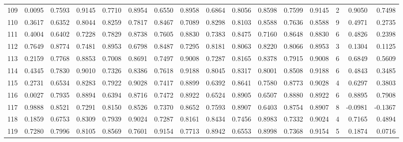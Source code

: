 \begin{tabular}{lrrrrrrrrrrrrrrr}
109 &      0.0095 &  0.7593 &  0.9145 &  0.7710 &  0.8954 &  0.6550 &  0.8958 &  0.6864 &  0.8056 &  0.8598 &   0.7599 &     0.9145 &      2 &                    0.9050 &                     0.7498 \\
110 &      0.3617 &  0.6352 &  0.8044 &  0.8259 &  0.7817 &  0.8467 &  0.7089 &  0.8298 &  0.8103 &  0.8588 &   0.7636 &     0.8588 &      9 &                    0.4971 &                     0.2735 \\
111 &      0.4004 &  0.6402 &  0.7228 &  0.7829 &  0.8738 &  0.7605 &  0.8830 &  0.7383 &  0.8475 &  0.7160 &   0.8648 &     0.8830 &      6 &                    0.4826 &                     0.2398 \\
112 &      0.7649 &  0.8774 &  0.7481 &  0.8953 &  0.6798 &  0.8487 &  0.7295 &  0.8181 &  0.8063 &  0.8220 &   0.8066 &     0.8953 &      3 &                    0.1304 &                     0.1125 \\
113 &      0.2159 &  0.7768 &  0.8853 &  0.7008 &  0.8691 &  0.7497 &  0.9008 &  0.7287 &  0.8165 &  0.8378 &   0.7915 &     0.9008 &      6 &                    0.6849 &                     0.5609 \\
114 &      0.4345 &  0.7830 &  0.9010 &  0.7326 &  0.8386 &  0.7618 &  0.9188 &  0.8045 &  0.8317 &  0.8001 &   0.8508 &     0.9188 &      6 &                    0.4843 &                     0.3485 \\
115 &      0.2731 &  0.6534 &  0.8283 &  0.7922 &  0.9028 &  0.7417 &  0.8899 &  0.6392 &  0.8641 &  0.7580 &   0.8773 &     0.9028 &      4 &                    0.6297 &                     0.3803 \\
116 &      0.0027 &  0.7935 &  0.8894 &  0.6394 &  0.8716 &  0.7472 &  0.8922 &  0.6524 &  0.8905 &  0.6507 &   0.8880 &     0.8922 &      6 &                    0.8895 &                     0.7908 \\
117 &      0.9888 &  0.8521 &  0.7291 &  0.8150 &  0.8526 &  0.7370 &  0.8652 &  0.7593 &  0.8907 &  0.6403 &   0.8754 &     0.8907 &      8 &                   -0.0981 &                    -0.1367 \\
118 &      0.1859 &  0.6753 &  0.8309 &  0.7939 &  0.9024 &  0.7287 &  0.8161 &  0.8434 &  0.7456 &  0.8983 &   0.7332 &     0.9024 &      4 &                    0.7165 &                     0.4894 \\
119 &      0.7280 &  0.7996 &  0.8105 &  0.8569 &  0.7601 &  0.9154 &  0.7713 &  0.8942 &  0.6553 &  0.8998 &   0.7368 &     0.9154 &      5 &                    0.1874 &                     0.0716 \\

\end{tabular}
